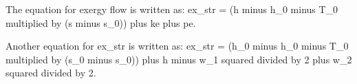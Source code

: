 The equation for exergy flow is written as:  
ex_str = (h minus h_0 minus T_0 multiplied by (s minus s_0)) plus ke plus pe.  

Another equation for ex_str is written as:  
ex_str = (h_0 minus h_0 minus T_0 multiplied by (s_0 minus s_0)) plus h minus w_1 squared divided by 2 plus w_2 squared divided by 2.